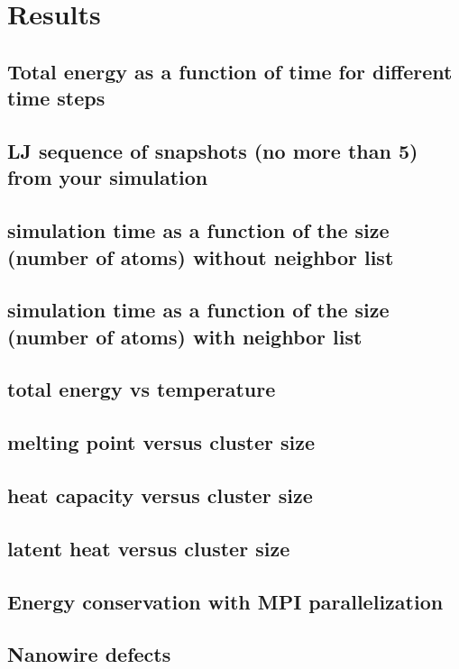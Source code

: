\chapter{Results}\label{chap:results}

\section{Total energy as a function of time for different time steps}

\section{LJ sequence of snapshots (no more than 5) from your simulation}

\section{simulation time as a function of the size (number of atoms) without neighbor list}
\section{simulation time as a function of the size (number of atoms) with neighbor list}

\section{total energy vs temperature}
\section{melting point versus cluster size}
\section{heat capacity versus cluster size}
\section{latent heat versus cluster size}
\section{Energy conservation with MPI parallelization}
\section{Nanowire defects}